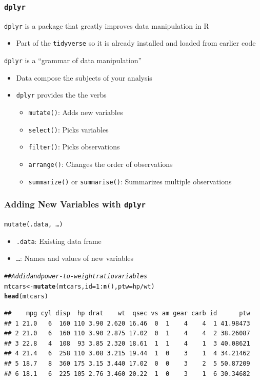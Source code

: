 \documentclass{beamer}\usepackage[]{graphicx}\usepackage[]{color}
\makeatletter
\newcommand{\hlnum}[1]{\textcolor[rgb]{0.686,0.059,0.569}{#1}}%
\newcommand{\hlcom}[1]{\textcolor[rgb]{0.678,0.584,0.686}{\textit{#1}}}%
\newcommand{\hlopt}[1]{\textcolor[rgb]{0,0,0}{#1}}%
\newcommand{\hlstd}[1]{\textcolor[rgb]{0.345,0.345,0.345}{#1}}%
\newcommand{\hlkwb}[1]{\textcolor[rgb]{0.69,0.353,0.396}{#1}}%
\newcommand{\hlkwc}[1]{\textcolor[rgb]{0.333,0.667,0.333}{#1}}%
\newcommand{\hlkwd}[1]{\textcolor[rgb]{0.737,0.353,0.396}{\textbf{#1}}}%
\newenvironment{kframe}{%
 \def\at@end@of@kframe{}%
 \ifinner\ifhmode%
  \def\at@end@of@kframe{\end{minipage}}%
  \begin{minipage}{\columnwidth}%
 \fi\fi%
 \def\FrameCommand##1{\hskip\@totalleftmargin \hskip-\fboxsep
 \colorbox{shadecolor}{##1}\hskip-\fboxsep
     \hskip-\linewidth \hskip-\@totalleftmargin \hskip\columnwidth}%
 \MakeFramed {\advance\hsize-\width
   \@totalleftmargin\z@ \linewidth\hsize
   \@setminipage}}%
 {\par\unskip\endMakeFramed%
 \at@end@of@kframe}
\newenvironment{knitrout}{}{} %
\makeatother
\begin{document}
\begin{frame}\frametitle{\texttt{dplyr}}
    \texttt{dplyr} is a package that greatly improves data manipulation in R
    \begin{itemize}
        \item Part of the \texttt{tidyverse} so it is already installed and loaded from earlier code
    \end{itemize}
    \vspace{3ex}
    \texttt{dplyr} is a ``grammar of data manipulation''
    \begin{itemize}
        \item Data compose the subjects of your analysis
        \item \texttt{dplyr} provides the the verbs
        \begin{itemize}
            \item \texttt{mutate()}: Adds new variables
            \item \texttt{select()}: Picks variables
            \item \texttt{filter()}: Picks observations
            \item \texttt{arrange()}: Changes the order of observations
            \item \texttt{summarize()} or \texttt{summarise()}: Summarizes multiple observations
        \end{itemize}
    \end{itemize}
\end{frame}

\begin{frame}[fragile]\frametitle{Adding New Variables with \texttt{dplyr}}
    \texttt{mutate(.data, \ldots)}
    \begin{itemize}
        \item \texttt{.data}: Existing data frame
        \item \texttt{\ldots}: Names and values of new variables
    \end{itemize}
\begin{knitrout}\footnotesize
{}\color{fgcolor}\begin{kframe}
\begin{alltt}
\hlcom{## Add id and power-to-weight ratio variables}
\hlstd{mtcars} \hlkwb{<-} \hlkwd{mutate}\hlstd{(mtcars,} \hlkwc{id} \hlstd{=} \hlnum{1}\hlopt{:}\hlkwd{n}\hlstd{(),} \hlkwc{ptw} \hlstd{= hp} \hlopt{/} \hlstd{wt)}
\hlkwd{head}\hlstd{(mtcars)}
\end{alltt}
\begin{verbatim}
##    mpg cyl disp  hp drat    wt  qsec vs am gear carb id      ptw
## 1 21.0   6  160 110 3.90 2.620 16.46  0  1    4    4  1 41.98473
## 2 21.0   6  160 110 3.90 2.875 17.02  0  1    4    4  2 38.26087
## 3 22.8   4  108  93 3.85 2.320 18.61  1  1    4    1  3 40.08621
## 4 21.4   6  258 110 3.08 3.215 19.44  1  0    3    1  4 34.21462
## 5 18.7   8  360 175 3.15 3.440 17.02  0  0    3    2  5 50.87209
## 6 18.1   6  225 105 2.76 3.460 20.22  1  0    3    1  6 30.34682
\end{verbatim}
\end{kframe}
\end{knitrout}
\end{frame}
\end{document}
